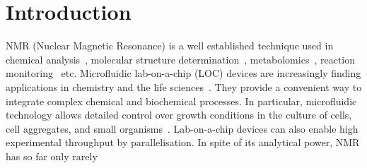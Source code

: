\documentclass[preprint,5p]{elsarticle}
\begin{document}
\section{Introduction}
\label{sec:intro}
NMR (Nuclear Magnetic Resonance) is a well established technique used in
chemical analysis~\cite{NMR-chemical-1995, hills1994magnetic,
rabenstein1991quantitative}, molecular structure
determination~\cite{wuthrich1990protein},
metabolomics~\cite{nmr-metabolomics-future-2017,nmr-metabolomics-2016}, reaction
monitoring~\cite{maiwald2004quantitative} etc. Microfluidic lab-on-a-chip (LOC)
devices are increasingly finding applications in chemistry and the life
sciences~\cite{whitesides2006origins,mark2010microfluidic}. They provide a
convenient way to integrate complex chemical and biochemical processes. In
particular, microfluidic technology allows detailed control over growth
conditions in the culture of cells, cell aggregates, and small
organisms~\cite{cellonchip-2006,cellonchip-review,tissueonchip-2008}.
Lab-on-a-chip devices can also enable high experimental throughput by
parallelisation. In spite of its analytical power, NMR has so far only rarely
\end{document}
